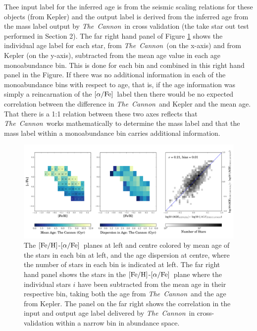 \documentclass[12pt, preprint]{aastex}
\newcommand{\project}[1]{\textsl{#1}}
\newcommand{\tc}{\project{The~Cannon}}
\newcommand{\feh}{\mbox{$\rm [Fe/H]$}}
\newcommand{\alphafe}{\mbox{$\rm [\alpha/Fe]$}}
\begin{document}
Thee input label for the inferred age is from the seismic scaling relations for these objects (from Kepler) and the output label is derived from the inferred age from the mass label output by \tc\ in cross validation (the take star out test performed in Section 2). The far right hand panel of Figure \ref{fig:alphabins} shows the individual age label for each star, from \tc\ (on the x-axis) and from Kepler (on the y-axis), subtracted from the mean age value in each age monoabundance bin. This is done for each bin and combined in this right hand panel in the Figure. If there was no additional information in each of the monoabundance bins with respect to age, that is, if the age information was simply a reincarnation of the \alphafe\ label then there would be no expected correlation between the difference in \tc\ and Kepler and the mean age. That there is a 1:1 relation between these two axes reflects that \tc\ works mathematically to determine the mass label and that the mass label within a monoabundance bin carries additional information.

\begin{figure}[h!]
\centering
  \includegraphics[scale=0.4]{./plots/alpha_feh_rc2.pdf}
    \caption{The \feh-\alphafe\ planes at left and centre colored by mean age of the stars in each bin at left,  and the age dispersion at centre, where the number of stars in each bin is indicated at left. The far right hand panel shows the stars in the \feh-\alphafe\ plane where the individual stars $i$ have been subtracted from the mean age in their respective bin, taking both the age from \tc\ and the age from Kepler. The panel on the far right shows the correlation in the input and output age label delivered by \tc\ in cross-validation within a narrow bin in abundance space.  }
\label{fig:alphabins}
\end{figure}
\end{document}
